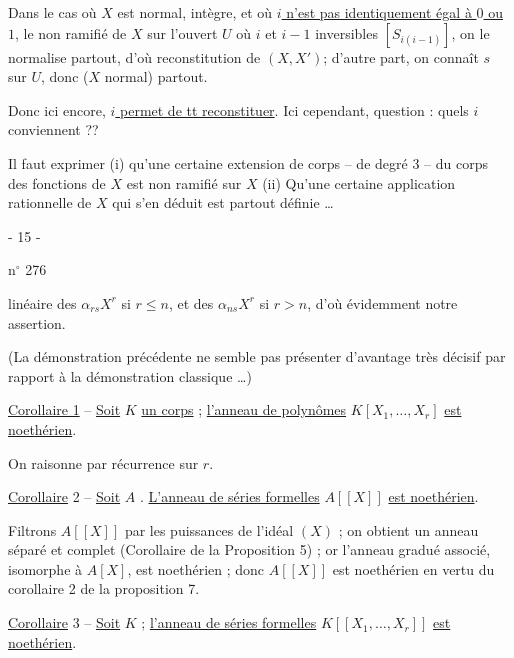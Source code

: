 Dans le cas où $X$ est normal, intègre, et où \uline{$i$ n'est pas identiquement égal à $0$ ou $1$},  le  non ramifié de $X$ sur l'ouvert $U$ où $i$ et $i-1$ inversibles $[S_{i(i-1)}]$, on le normalise partout, d'où reconstitution de $(X,X')$; d'autre part, on connaît $s$ sur $U$, donc ($X$ normal) partout.

Donc ici encore, \uline{$i$ permet de tt reconstituer}. Ici cependant,  question : quels $i$ conviennent ??

Il faut exprimer (i) qu'une certaine extension de corps -- de degré $3$ -- du corps des fonctions de $X$ est non ramifié sur $X$ (ii) Qu'une certaine application rationnelle de $X$ qui s'en déduit est partout définie \ldots
{}

\begin{center}- 15 -\end{center}
\hfill n$^\circ$ 276

linéaire des $\alpha_{rs}X^r$ si $r\leq n$, et des $\alpha_{ns}X^r$ si $r>n$, d'où évidemment notre assertion.

(La démonstration précédente ne semble pas présenter d'avantage très décisif par rapport à la démonstration classique \ldots)

\uline{Corollaire 1} -- \uline{Soit} $K$ \uline{un corps} ; \uline{l'anneau de polynômes} $K[X_1,\ldots,X_r]$ \uline{est noethérien}.

On raisonne par récurrence sur $r$.

\uline{Corollaire} 2 -- \uline{Soit} $A$ . \uline{L'anneau de séries formelles} $A[[X]]$ \uline{est noethérien}.

Filtrons $A[[X]]$ par les puissances de l'idéal $(X)$ ; on obtient un anneau séparé et complet (Corollaire de la Proposition 5) ; or l'anneau gradué associé, isomorphe à $A[X]$, est noethérien ; donc $A[[X]]$ est noethérien en vertu du corollaire 2 de la proposition 7.

\uline{Corollaire} 3 -- \uline{Soit} $K$  ; \uline{l'anneau de séries formelles} $K[[X_1,\ldots,X_r]]$ \uline{est noethérien}.

